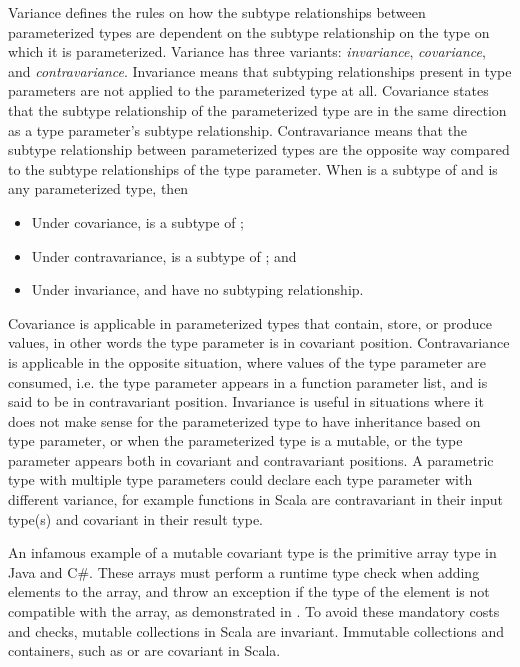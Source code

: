 Variance defines the rules on how the subtype relationships between parameterized types are dependent on the subtype relationship on the type on which it is parameterized. Variance has three variants: \emph{invariance}, \emph{covariance}, and \emph{contravariance}. Invariance means that subtyping relationships present in type parameters are not applied to the parameterized type at all. Covariance states that the subtype relationship of the parameterized type are in the same direction as a type parameter's subtype relationship. Contravariance means that the subtype relationship between parameterized types are the opposite way compared to the subtype relationships of the type parameter. When  is a subtype of  and  is any parameterized type, then
\begin{itemize}
    \item Under covariance,  is a subtype of ;
    \item Under contravariance,  is a subtype of ; and
    \item Under invariance,  and  have no subtyping relationship.
\end{itemize}

Covariance is applicable in parameterized types that contain, store, or produce values, in other words the type parameter is in covariant position. Contravariance is applicable in the opposite situation, where values of the type parameter are consumed, i.e. the type parameter appears in a function parameter list, and is said to be in contravariant position. Invariance is useful in situations where it does not make sense for the parameterized type to have inheritance based on type parameter, or when the parameterized type is a mutable, or the type parameter appears both in covariant and contravariant positions. A parametric type with multiple type parameters could declare each type parameter with different variance, for example functions in Scala are contravariant in their input type(s) and covariant in their result type.

An infamous example of a mutable covariant type is the primitive array type in Java and C\#.
These arrays must perform a runtime type check when adding elements to the array, and throw an exception if the type of the element is not compatible with the array, as demonstrated in . To avoid these mandatory costs and checks, mutable collections in Scala are invariant. Immutable collections and containers, such as  or  are covariant in Scala.

